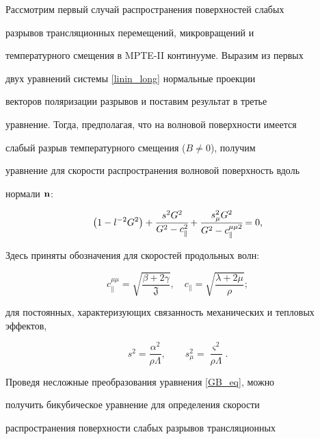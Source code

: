 Рассмотрим первый случай распространения поверхностей слабых

разрывов трансляционных перемещений, микровращений и

температурного смещения в MPTE-II континууме. Выразим из первых

двух уравнений системы \eqref{linin_long} нормальные проекции

векторов поляризации разрывов и поставим результат в третье

уравнение. Тогда, предполагая, что на волновой поверхности имеется

слабый разрыв температурного смещения ($B \ne 0$), получим

уравнение для скорости распространения волновой поверхность вдоль

нормали ${\bf n}$:

\begin{equation}

\label{GB_eq} \left(1- l^{-2}G^2 \right) +  \cfrac{s^2

G^2}{G^2-c_{\parallel}^2} + \cfrac{s_{\mu}^2

G^2}{G^2-c_{\parallel}^{\mu\mu 2}}=0,

\end{equation}

Здесь приняты обозначения для скоростей продольных волн:

\begin{equation}

\label{Long_wave}

c^{\mu \mu}_\parallel=\sqrt{\dfrac{\beta + 2\gamma}{\mathfrak{J}}}, \quad c_{\parallel}=\sqrt{\dfrac{\lambda + 2\mu}{\rho}};

\end{equation}

для постоянных, характеризующих связанность механических и тепловых эффектов,

\begin{equation}\label{CCC}

s^2=\dfrac{\alpha^2}{\rho \Lambda},\qquad  s_{\mu}^2=\dfrac{\varsigma^2}{\rho \Lambda}.

\end{equation}



Проведя несложные преобразования уравнения \eqref{GB_eq}, можно

получить бикубическое уравнение для определения скорости

распространения поверхности слабых разрывов трансляционных

